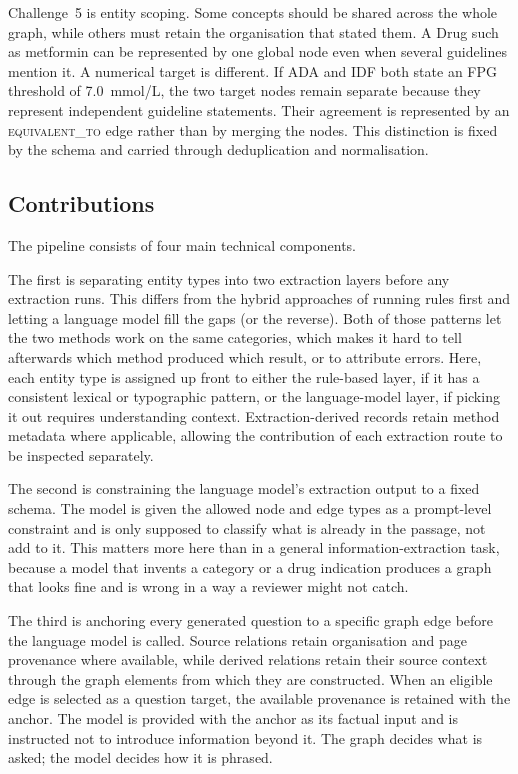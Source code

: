 Challenge~5 is entity scoping. Some concepts should be shared across the
whole graph, while others must retain the organisation that stated them.
A Drug such as metformin can be represented by one global node even when
several guidelines mention it. A numerical target is different. If ADA
and IDF both state an FPG threshold of 7.0~mmol/L, the two target nodes
remain separate because they represent independent guideline statements.
Their agreement is represented by an \textsc{equivalent\_to} edge rather
than by merging the nodes. This distinction is fixed by the schema and
carried through deduplication and normalisation.

\subsection*{Contributions}

The pipeline consists of four main technical components.

The first is separating entity types into two extraction layers before any extraction runs. This differs from the hybrid approaches of running rules first and letting a language model fill the gaps (or the reverse). Both of those patterns let the two methods work on the same categories, which makes it hard to tell afterwards which method produced which result, or to attribute errors. Here, each entity type is assigned up front to either the rule-based layer, if it has a consistent lexical or typographic pattern, or the language-model layer, if picking it out requires understanding context. Extraction-derived records retain method metadata where applicable, allowing the contribution of each extraction route to be inspected separately.

The second is constraining the language model's extraction output to a fixed schema. The model is given the allowed node and edge types as a prompt-level constraint and is only supposed to classify what is already in the passage, not add to it. This matters more here than in a general information-extraction task, because a model that invents a category or a drug indication produces a graph that looks fine and is wrong in a way a reviewer might not catch.

The third is anchoring every generated question to a specific graph edge
before the language model is called. Source relations retain organisation
and page provenance where available, while derived relations retain their
source context through the graph elements from which they are constructed.
When an eligible edge is selected as a question target, the available
provenance is retained with the anchor. The model is provided with the
anchor as its factual input and is instructed not to introduce information
beyond it. The graph decides what is asked; the model decides how it is
phrased.

